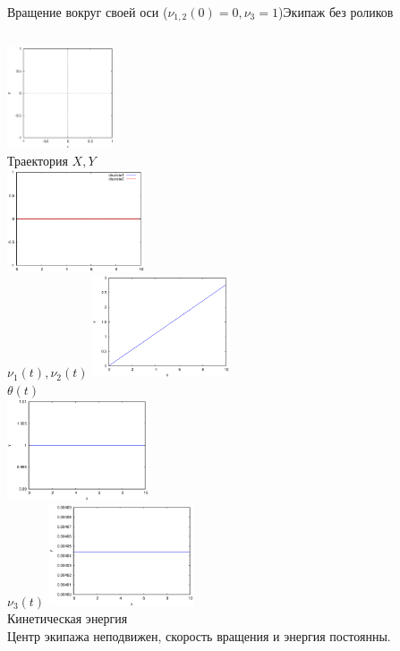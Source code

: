 \documentclass{beamer}
\begin{document}
\begin{frame}{Вращение вокруг своей оси ($\nu_{1,2}(0) = 0, \nu_3 = 1$)}{Экипаж без роликов}
    \begin{columns}
            \centering
            \includegraphics[width=\linewidth, height=30mm]{_old_sol__0_0_1__0__10__1e2_trajectory} \\
            Траектория $X, Y$ \\
            \includegraphics[width=\linewidth, height=30mm]{_old_sol__0_0_1__0__10__1e2_nu12} \\
            $\nu_1(t), \nu_2(t)$
            \centering
            \includegraphics[width=\linewidth, height=30mm]{_old_sol__0_0_1__0__10__1e2_theta} \\
            $\theta(t)$ \\
            \includegraphics[width=\linewidth, height=30mm]{_old_sol__0_0_1__0__10__1e2_nu3} \\
            $\nu_3(t)$
            \centering
            \includegraphics[width=\linewidth, height=30mm]{_old_sol__0_0_1__0__10__1e2_kin_en} \\
            Кинетическая энергия \\
            \vspace{15pt}
            Центр экипажа неподвижен, скорость вращения и энергия постоянны.
    \end{columns}
\end{frame}
\end{document}
